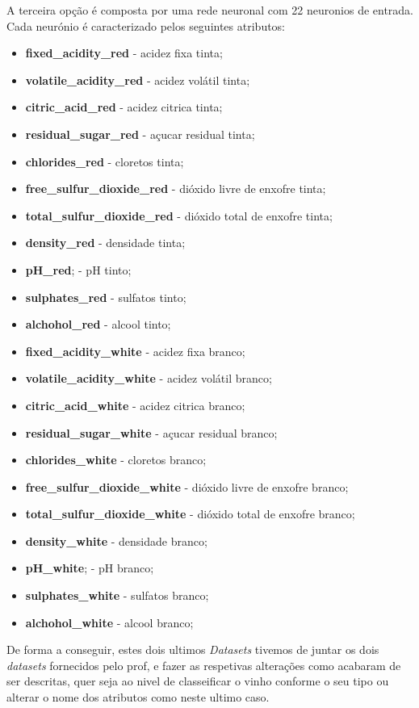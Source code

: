 \documentclass{report}
\begin{document}
A terceira opção é composta por uma rede neuronal com 22 neuronios de entrada. Cada neurónio é caracterizado pelos seguintes atributos:
\bigbreak
\begin{itemize}
\item{\textbf{fixed\_acidity\_red} - acidez fixa tinta;} 
\item{\textbf{volatile\_acidity\_red} - acidez volátil tinta;}
\item{\textbf{citric\_acid\_red} - acidez citrica tinta;}
\item{\textbf{residual\_sugar\_red} - açucar residual tinta;}
\item{\textbf{chlorides\_red} - cloretos tinta;}
\item{\textbf{free\_sulfur\_dioxide\_red} - dióxido livre de enxofre tinta;}
\item{\textbf{total\_sulfur\_dioxide\_red} - dióxido total de enxofre tinta;}
\item{\textbf{density\_red} - densidade tinta;}
\item{\textbf{pH\_red}; - pH tinto;}
\item{\textbf{sulphates\_red} - sulfatos tinto;}
\item{\textbf{alchohol\_red} - alcool tinto;} 
\item{\textbf{fixed\_acidity\_white} - acidez fixa branco;} 
\item{\textbf{volatile\_acidity\_white} - acidez volátil branco;}
\item{\textbf{citric\_acid\_white} - acidez citrica branco;}
\item{\textbf{residual\_sugar\_white} - açucar residual branco;}
\item{\textbf{chlorides\_white} - cloretos branco;}
\item{\textbf{free\_sulfur\_dioxide\_white} - dióxido livre de enxofre branco;}
\item{\textbf{total\_sulfur\_dioxide\_white} - dióxido total de enxofre branco;}
\item{\textbf{density\_white} - densidade branco;}
\item{\textbf{pH\_white}; - pH branco;}
\item{\textbf{sulphates\_white} - sulfatos branco;}
\item{\textbf{alchohol\_white} - alcool branco;} 
\end{itemize}
\bigbreak

De forma a conseguir, estes dois ultimos \textit{Datasets} tivemos de juntar os dois \textit{datasets} fornecidos pelo prof, e fazer as respetivas alterações como acabaram de ser descritas, quer seja ao nivel de classeificar o vinho conforme o seu tipo ou alterar o nome dos atributos como neste ultimo caso.
\end{document}
